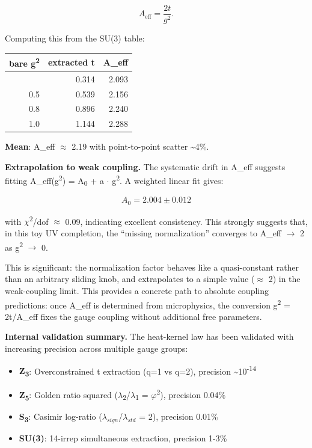 \documentclass[11pt,a4paper]{article}
\theoremstyle{remark}
\providecommand{\tightlist}{%
  \setlength{\itemsep}{0pt}\setlength{\parskip}{0pt}}
\begin{document}
\[
A_\mathrm{eff} = \frac{2t}{g^2}.
\]

Computing this from the SU(3) table:

{\def\LTcaptype{none} %
\begin{longtable}[]{@{}rrr@{}}
\toprule\noalign{}
bare g\textsuperscript{2} & extracted t & A\_eff \\
\midrule\noalign{}
\endhead
\bottomrule\noalign{}
\endlastfoot
0.3 & 0.314 & 2.093 \\
0.5 & 0.539 & 2.156 \\
0.8 & 0.896 & 2.240 \\
1.0 & 1.144 & 2.288 \\
\end{longtable}
}

\textbf{Mean}: A\_eff \ensuremath{\approx} 2.19 with point-to-point scatter \textasciitilde4\%.

\textbf{Extrapolation to weak coupling.} The systematic drift in A\_eff
suggests fitting A\_eff(g\textsuperscript{2}) = A\textsubscript{0} + a \ensuremath{\cdot} g\textsuperscript{2}. A weighted linear
fit gives:

\[
A_0 = 2.004 \pm 0.012
\]

with \ensuremath{\chi}\textsuperscript{2}/dof \ensuremath{\approx} 0.09, indicating excellent consistency. This
strongly suggests that, in this toy UV completion, the ``missing normalization''
converges to A\_eff \ensuremath{\to} 2 as g\textsuperscript{2} \ensuremath{\to} 0.

This is significant: the normalization factor behaves like a quasi-constant
rather than an arbitrary sliding knob, and extrapolates to a simple value
(\ensuremath{\approx} 2) in the weak-coupling limit. This provides a concrete path to
absolute coupling predictions: once A\_eff is determined from
microphysics, the conversion g\textsuperscript{2} = 2t/A\_eff fixes the gauge
coupling without additional free parameters.

\textbf{Internal validation summary.} The heat-kernel law has been validated with
increasing precision across multiple gauge groups:

\begin{itemize}
\tightlist
\item
  \textbf{Z\textsubscript{3}}: Overconstrained t extraction (q=1 vs q=2), precision \textasciitilde10\textsuperscript{-14}
\item
  \textbf{Z\textsubscript{5}}: Golden ratio squared (\ensuremath{\lambda}\textsubscript{2}/\ensuremath{\lambda}\textsubscript{1} = \ensuremath{\varphi}\textsuperscript{2}), precision 0.04\%
\item
  \textbf{S\textsubscript{3}}: Casimir log-ratio ($\lambda_{sign}$/$\lambda_{std}$ = 2), precision 0.01\%
\item
  \textbf{SU(3)}: 14-irrep simultaneous extraction, precision 1-3\%
\end{itemize}
\end{document}

